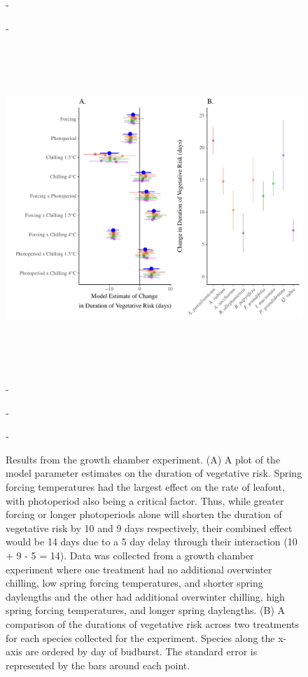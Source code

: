 \documentclass{article}\usepackage[]{graphicx}\usepackage[]{color}
\begin{document}
\begin{figure} [H] 
 -\begin{center}
 -\includegraphics[width=16cm, height=13cm]{..//figure/ExpFig_withRandom.pdf} 
 -\caption{Results from the growth chamber experiment. (A) A plot of the model parameter estimates on the duration of vegetative risk. Spring forcing temperatures had the largest effect on the rate of leafout, with photoperiod also being a critical factor. Thus, while greater forcing or longer photoperiods alone will shorten the duration of vegetative risk by 10 and 9 days respectively, their combined effect would be 14 days due to a 5 day delay through their interaction (10 + 9 - 5 = 14). Data was collected from a growth chamber experiment where one treatment had no additional overwinter chilling, low spring forcing temperatures, and shorter spring daylengths and the other had additional overwinter chilling, high spring forcing temperatures, and longer spring daylengths. (B) A comparison of the durations of vegetative risk across two treatments for each species collected for the experiment. Species along the x-axis are ordered by day of budburst. The standard error is represented by the bars around each point. }\label{fig:dan} 
 -\end{center}
 -\end{figure}
\end{document}

